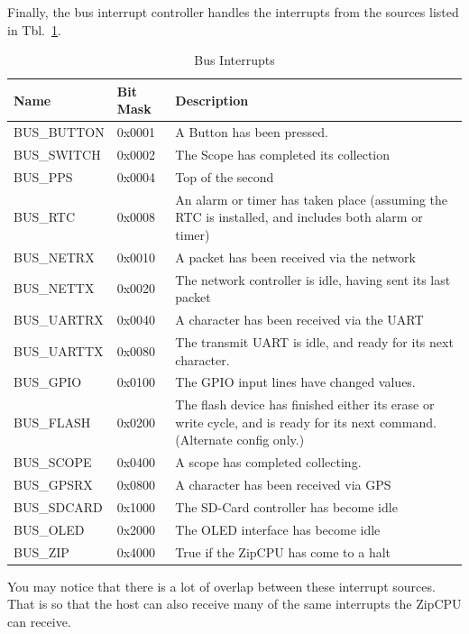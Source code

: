 \documentclass{gqtekspec}
\begin{document}
Finally, the bus interrupt controller handles the interrupts from the sources
listed in Tbl.~\ref{tbl:bus-ints}.
\begin{table}[htbp]
\begin{center}\begin{tabular}{|p{0.9in}|p{0.75in}|p{3.75in}|}\hline
\rowcolor[gray]{0.85} Name & Bit Mask & Description \\\hline\hline
BUS\_BUTTON & 0x0001 & A Button has been pressed. \\\hline
BUS\_SWITCH & 0x0002 & The Scope has completed its collection\\\hline
BUS\_PPS    & 0x0004 & Top of the second\\\hline
BUS\_RTC    & 0x0008 & An alarm or timer has taken place (assuming the RTC
		is installed, and includes both alarm or timer)\\\hline
BUS\_NETRX & 0x0010 & A packet has been received via the network\\\hline
BUS\_NETTX & 0x0020 & The network controller is idle, having sent its
			last packet\\\hline
BUS\_UARTRX & 0x0040 & A character has been received via the UART\\\hline
BUS\_UARTTX & 0x0080 & The transmit UART is idle, and ready for its next
		character.\\\hline
BUS\_GPIO   & 0x0100 & The GPIO input lines have changed values.\\\hline
BUS\_FLASH  & 0x0200 & The flash device has finished either its erase or
		write cycle, and is ready for its next command. (Alternate
	config only.)\\\hline
BUS\_SCOPE  & 0x0400 & A scope has completed collecting.\\\hline
BUS\_GPSRX  & 0x0800 & A character has been received via GPS\\\hline
BUS\_SDCARD & 0x1000 & The SD-Card controller has become idle\\\hline
BUS\_OLED   & 0x2000 & The OLED interface has become idle\\\hline
BUS\_ZIP    & 0x4000 & True if the ZipCPU has come to a halt\\\hline
\end{tabular}
\caption{Bus Interrupts}\label{tbl:bus-ints}
\end{center}\end{table}
You may notice that there is a lot of overlap between these interrupt sources.
That is so that the host can also receive many of the same interrupts the ZipCPU
can receive.
\end{document}
